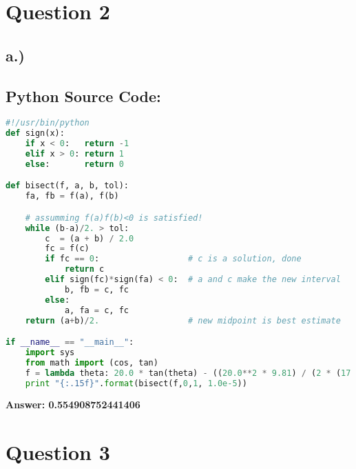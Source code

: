\documentclass{article}
\begin{document}
\pagebreak


\section*{Question 2}
\subsection*{a.)}
\subsection*{Python Source Code: }
\begin{lstlisting}[language=Python]
#!/usr/bin/python
def sign(x):
    if x < 0:	return -1
    elif x > 0: return 1
    else:		return 0

def bisect(f, a, b, tol):
    fa, fb = f(a), f(b)

    # assumming f(a)f(b)<0 is satisfied!
    while (b-a)/2. > tol:
        c  = (a + b) / 2.0
        fc = f(c)
        if fc == 0:                  # c is a solution, done
            return c
        elif sign(fc)*sign(fa) < 0:  # a and c make the new interval
            b, fb = c, fc
        else:
            a, fa = c, fc
    return (a+b)/2.                  # new midpoint is best estimate

if __name__ == "__main__":
    import sys
    from math import (cos, tan)
    f = lambda theta: 20.0 * tan(theta) - ((20.0**2 * 9.81) / (2 * (17.0**2) * cos(theta)**2)) - 3
    print "{:.15f}".format(bisect(f,0,1, 1.0e-5))

\end{lstlisting}

\begin{center}
  \textbf{ Answer: 0.554908752441406}
\end{center}


\pagebreak
\section*{Question 3}
\end{document}
